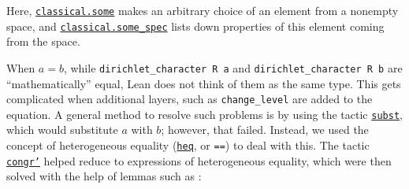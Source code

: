 \documentclass[a4paper,UKenglish,cleveref, autoref, thm-restate]{lipics-v2021}
\newcommand{\lean}[1]{\texttt{#1}\xspace} %
\begin{document}
Here, \href{https://leanprover-community.github.io/mathlib_docs/init/classical.html#classical.some}{\lean{classical.some}} 
makes an arbitrary choice of an element from a nonempty space, and \href{https://leanprover-community.github.io/mathlib_docs/init/classical.html#classical.some_spec}{\lean{classical.some\_spec}} 
lists down properties of this element coming from the space. 

When $a = b$, while \lean{dirichlet\_character R a} and \lean{dirichlet\_character R b} are ``mathematically'' equal, Lean does 
not think of them as the same type. This gets complicated when additional layers, such as \lean{change\_level} are added to the equation. 
A general method to resolve such problems is by using the tactic \href{https://leanprover-community.github.io/mathlib_docs/tactics.html#subst}{\lean{subst}}, 
which would substitute $a$ with $b$; however, that failed. Instead, we used the concept of heterogeneous equality (\href{https://leanprover-community.github.io/mathlib_docs/init/core.html#heq}{\lean{heq}}, or \lean{==}) 
to deal with this. The tactic \href{https://leanprover-community.github.io/mathlib_docs/tactics.html#congr'}{\lean{congr'}} helped reduce to expressions of heterogeneous equality, 
which were then solved with the help of lemmas such as :
\end{document}
